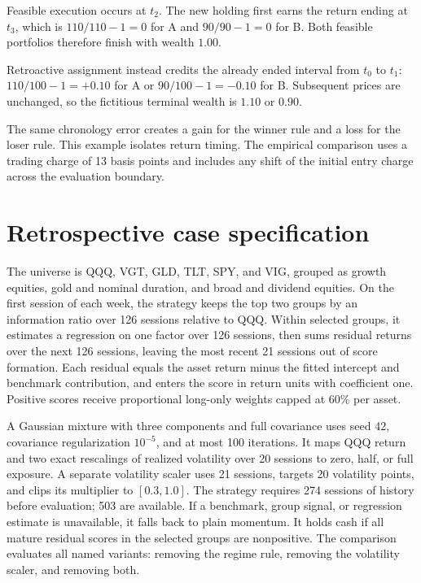 \documentclass{article}
\begin{document}
Feasible execution occurs at $t_2$. The new holding first earns the return ending at $t_3$, which is $110/110-1=0$ for A and $90/90-1=0$ for B. Both feasible portfolios therefore finish with wealth $1.00$.

Retroactive assignment instead credits the already ended interval from $t_0$ to $t_1$: $110/100-1=+0.10$ for A or $90/100-1=-0.10$ for B. Subsequent prices are unchanged, so the fictitious terminal wealth is $1.10$ or $0.90$.

The same chronology error creates a gain for the winner rule and a loss for the loser rule. This example isolates return timing. The empirical comparison uses a trading charge of 13 basis points and includes any shift of the initial entry charge across the evaluation boundary.

\section{Retrospective case specification}
\label{app:retrospective}

The universe is QQQ, VGT, GLD, TLT, SPY, and VIG, grouped as growth equities,
gold and nominal duration, and broad and dividend equities. On the first session
of each week, the strategy keeps the top two groups by an information
ratio over 126 sessions relative to QQQ. Within selected groups, it estimates a regression on one factor over 126 sessions,
then sums residual returns over the next 126 sessions, leaving the most recent
21 sessions out of score formation. Each residual equals the asset return minus the fitted intercept
and benchmark contribution, and enters the score in return units with coefficient one.
Positive scores receive proportional long-only
weights capped at 60\% per asset.

A Gaussian mixture with three components and full covariance uses seed 42, covariance
regularization $10^{-5}$, and at most 100 iterations. It maps QQQ return and two
exact rescalings of realized volatility over 20 sessions to zero, half, or full
exposure. A separate volatility scaler uses 21 sessions, targets 20 volatility points,
and clips its multiplier to $[0.3,1.0]$. The strategy requires 274 sessions of history before evaluation; 503 are available. If a benchmark, group signal, or regression estimate
is unavailable, it falls back to plain momentum. It holds cash if all mature
residual scores in the selected groups are nonpositive. The comparison evaluates all named variants: removing the regime rule, removing the volatility scaler, and removing both.
\end{document}
